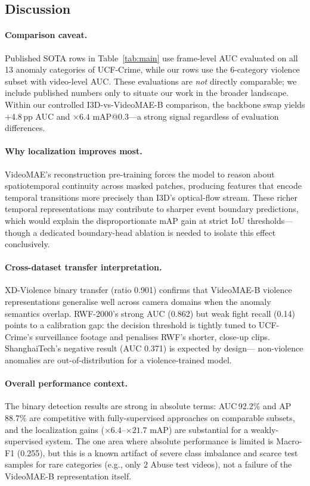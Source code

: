 \documentclass[11pt]{article}
\begin{document}
\subsection{Discussion}
\label{sec:discuss}

\paragraph{Comparison caveat.}
Published SOTA rows in Table~\ref{tab:main} use frame-level AUC evaluated
on all 13 anomaly categories of UCF-Crime, while our rows use the 6-category
violence subset with video-level AUC.
These evaluations are \emph{not} directly comparable; we include published
numbers only to situate our work in the broader landscape.
Within our controlled I3D-vs-VideoMAE-B comparison, the backbone swap
yields $+$4.8\,pp AUC and ${\times}6.4$ mAP@0.3—a strong signal
regardless of evaluation differences.

\paragraph{Why localization improves most.}
VideoMAE's reconstruction pre-training forces the model to reason about
spatiotemporal continuity across masked patches, producing features that
encode temporal transitions more precisely than I3D's optical-flow stream.
These richer temporal representations may contribute to sharper event boundary
predictions, which would explain the disproportionate mAP gain at strict IoU
thresholds—though a dedicated boundary-head ablation is needed to isolate this
effect conclusively.

\paragraph{Cross-dataset transfer interpretation.}
XD-Violence binary transfer (ratio 0.901) confirms that VideoMAE-B violence
representations generalise well across camera domains when the anomaly
semantics overlap.
RWF-2000's strong AUC (0.862) but weak fight recall (0.14) points to a
calibration gap: the decision threshold is tightly tuned to UCF-Crime's
surveillance footage and penalises RWF's shorter, close-up clips.
ShanghaiTech's negative result (AUC 0.371) is expected by design—
non-violence anomalies are out-of-distribution for a violence-trained model.

\paragraph{Overall performance context.}
The binary detection results are strong in absolute terms: AUC\,92.2\% and
AP\,88.7\% are competitive with fully-supervised approaches on comparable
subsets, and the localization gains (${\times}6.4$--${\times}21.7$ mAP) are
substantial for a weakly-supervised system.
The one area where absolute performance is limited is Macro-F1 (0.255), but
this is a known artifact of severe class imbalance and scarce test samples for
rare categories (e.g., only 2 Abuse test videos), not a failure of the
VideoMAE-B representation itself.
\end{document}
